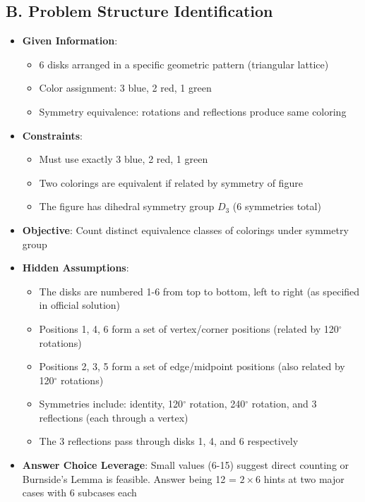 \documentclass[11pt]{article}
\begin{document}
\begin{problemconfigbox}
\subsection*{B. Problem Structure Identification}
\begin{itemize}[leftmargin=*]
    \item \textbf{Given Information}: 
    \begin{itemize}
        \item 6 disks arranged in a specific geometric pattern (triangular lattice)
        \item Color assignment: 3 blue, 2 red, 1 green
        \item Symmetry equivalence: rotations and reflections produce same coloring
    \end{itemize}
    \item \textbf{Constraints}: 
    \begin{itemize}
        \item Must use exactly 3 blue, 2 red, 1 green
        \item Two colorings are equivalent if related by symmetry of figure
        \item The figure has dihedral symmetry group $D_3$ (6 symmetries total)
    \end{itemize}
    \item \textbf{Objective}: Count distinct equivalence classes of colorings under symmetry group
    \item \textbf{Hidden Assumptions}: 
    \begin{itemize}
        \item The disks are numbered 1-6 from top to bottom, left to right (as specified in official solution)
        \item Positions 1, 4, 6 form a set of vertex/corner positions (related by 120$^\circ$ rotations)
        \item Positions 2, 3, 5 form a set of edge/midpoint positions (also related by 120$^\circ$ rotations)
        \item Symmetries include: identity, 120$^\circ$ rotation, 240$^\circ$ rotation, and 3 reflections (each through a vertex)
        \item The 3 reflections pass through disks 1, 4, and 6 respectively
    \end{itemize}
    \item \textbf{Answer Choice Leverage}: Small values (6-15) suggest direct counting or Burnside's Lemma is feasible. Answer being 12 = $2 \times 6$ hints at two major cases with 6 subcases each
\end{itemize}


\end{problemconfigbox}
\end{document}
